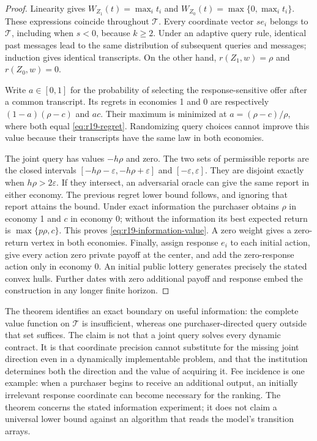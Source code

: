 \begin{proof}
Linearity gives $W_{Z_1}(t)=\max_i t_i$ and $W_{Z_0}(t)=\max\{0,\max_i t_i\}$. These expressions coincide throughout $\mathcal T$. Every coordinate vector $se_i$ belongs to $\mathcal T$, including when $s<0$, because $k\geq2$. Under an adaptive query rule, identical past messages lead to the same distribution of subsequent queries and messages; induction gives identical transcripts. On the other hand, $r(Z_1,w)=\rho$ and $r(Z_0,w)=0$.

Write $a\in[0,1]$ for the probability of selecting the response-sensitive offer after a common transcript. Its regrets in economies 1 and 0 are respectively $(1-a)(\rho-c)$ and $ac$. Their maximum is minimized at $a=(\rho-c)/\rho$, where both equal \eqref{eq:r19-regret}. Randomizing query choices cannot improve this value because their transcripts have the same law in both economies.

The joint query has values $-h\rho$ and zero. The two sets of permissible reports are the closed intervals $[-h\rho-\varepsilon,-h\rho+\varepsilon]$ and $[-\varepsilon,\varepsilon]$. They are disjoint exactly when $h\rho>2\varepsilon$. If they intersect, an adversarial oracle can give the same report in either economy. The previous regret lower bound follows, and ignoring that report attains the bound. Under exact information the purchaser obtains $\rho$ in economy 1 and $c$ in economy 0; without the information its best expected return is $\max\{p\rho,c\}$. This proves \eqref{eq:r19-information-value}. A zero weight gives a zero-return vertex in both economies. Finally, assign response $e_i$ to each initial action, give every action zero private payoff at the center, and add the zero-response action only in economy 0. An initial public lottery generates precisely the stated convex hulls. Further dates with zero additional payoff and response embed the construction in any longer finite horizon.
\end{proof}

The theorem identifies an exact boundary on useful information: the complete value function on $\mathcal T$ is insufficient, whereas one purchaser-directed query outside that set suffices. The claim is not that a joint query solves every dynamic contract. It is that coordinate precision cannot substitute for the missing joint direction even in a dynamically implementable problem, and that the institution determines both the direction and the value of acquiring it. Fee incidence is one example: when a purchaser begins to receive an additional output, an initially irrelevant response coordinate can become necessary for the ranking. The theorem concerns the stated information experiment; it does not claim a universal lower bound against an algorithm that reads the model's transition arrays.


